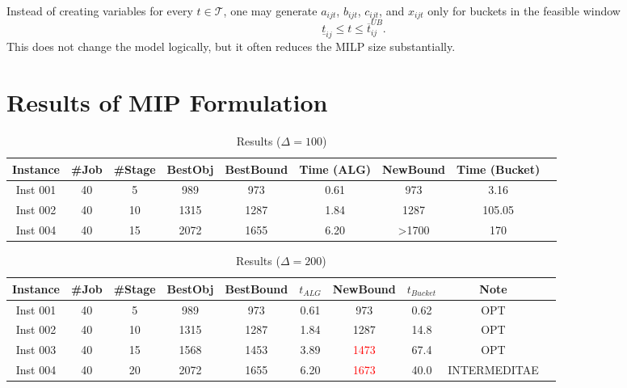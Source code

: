 \documentclass[11pt]{article}
\begin{document}
Instead of creating variables for every $t\in\mathcal T$, one may generate $a_{ijt}$, $b_{ijt}$, $c_{ijt}$, and $x_{ijt}$ only for buckets in the feasible window
\[
\underline t_{ij}\le t\le \overline t_{ij}^{UB}.
\]
This does not change the model logically, but it often reduces the MILP size substantially.




\section{Results of MIP Formulation}

\begin{table}[ht]
    \centering
    \begin{tabular}{c|c|c|c|c|c||c|c|c}
        Instance & \#Job & \#Stage & BestObj & BestBound & Time (ALG) & NewBound & Time (Bucket) \\
        \midrule
        Inst 001 & 40 & 5 & 989 & 973 & 0.61 & 973 & 3.16 \\
        Inst 002 & 40 & 10 & 1315 & 1287 & 1.84 & 1287 & 105.05 \\
        Inst 004 & 40 & 15 &2072 & 1655 & 6.20 & >1700 & 170 \\
    \end{tabular}
    \caption{Results ($\Delta = 100$)}
    \label{tab:placeholder}
\end{table}

\begin{table}[ht]
    \centering
    \begin{tabular}{c|c|c|c|c|c||c|c|c|c}
        Instance & \#Job & \#Stage & BestObj & BestBound & $t_{ALG}$ & NewBound & $t_{Bucket}$ & Note \\
        \midrule
        Inst 001 & 40 & 5 & 989 & 973 & 0.61 & 973 & 0.62 & OPT \\
        Inst 002 & 40 & 10 & 1315 & 1287 & 1.84 & 1287 & 14.8 & OPT \\
        Inst 003 & 40 & 15 & 1568 & 1453 & 3.89 & \textcolor{red}{1473} & 67.4 & OPT\\
        Inst 004 & 40 & 20 & 2072 & 1655 & 6.20 & \textcolor{red}{1673} & 40.0 & INTERMEDITAE\\
    \end{tabular}
    \caption{Results ($\Delta = 200$)}
    \label{tab:placeholder}
\end{table}
\end{document}
